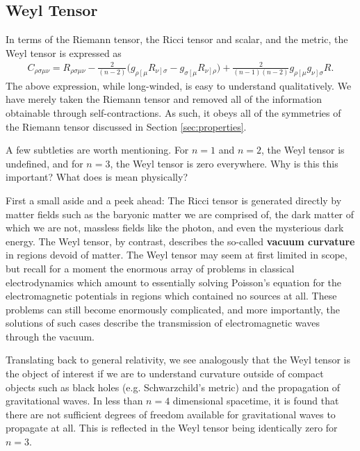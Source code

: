 \documentclass[10pt]{article}
\begin{document}
    \subsection{Weyl Tensor}
    In terms of the Riemann tensor, the Ricci tensor and scalar, and the metric, the Weyl tensor is expressed as 
    \begin{align}
    	C_{\rho\sigma\mu\nu} = R_{\rho\sigma\mu\nu} - \frac{2}{(n-2)} \Big( g_{\rho\left[\mu\right.}R_{\left.\nu\right]\sigma} - g_{\sigma\left[\mu\right.}R_{\left.\nu\right]\rho} \Big) + \frac{2}{(n-1)(n-2)} g_{\rho\left[\mu\right.}g_{\left.\nu\right]\sigma} R \label{eq:weyl} . 
    \end{align}
    The above expression, while long-winded, is easy to understand qualitatively. We have merely taken the Riemann tensor and removed all of the information obtainable through self-contractions. As such, it obeys all of the symmetries of the Riemann tensor discussed in Section \ref{sec:properties}. \\
    \par A few subtleties are worth mentioning. For $n=1$ and $n=2$, the Weyl tensor is undefined, and for $n=3$, the Weyl tensor is zero everywhere. Why is this this important? What does is mean physically?\\
    \par First a small aside and a peek ahead: The Ricci tensor is generated directly by matter fields such as the baryonic matter we are comprised of, the dark matter of which we are not, massless fields like the photon, and even the mysterious dark energy. The Weyl tensor, by contrast, describes the so-called \textbf{vacuum curvature} in regions devoid of matter. The Weyl tensor may seem at first limited in scope, but recall for a moment the enormous array of problems in classical electrodynamics which amount to essentially solving Poisson's equation for the electromagnetic potentials in regions which contained no sources at all. These problems can still become enormously complicated, and more importantly, the solutions of such cases describe the transmission of electromagnetic waves through the vacuum.\\
    \par Translating back to general relativity, we see analogously that the Weyl tensor is the object of interest if we are to understand curvature outside of compact objects such as black holes (e.g. Schwarzchild's metric) and the propagation of gravitational waves. In less than $n=4$ dimensional spacetime, it is found that there are not sufficient degrees of freedom available for gravitational waves to propagate at all. This is reflected in the Weyl tensor being identically zero for $n=3$. \\
\end{document}
